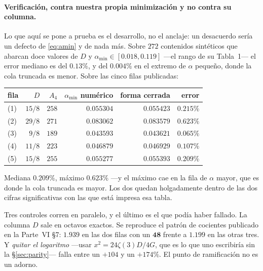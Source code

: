 \documentclass[11pt,a4paper]{article}
\newcommand{\rep}[1]{\mathbf{#1}}
\newcommand{\amin}{\alpha_{\min}}
\begin{document}
\paragraph{Verificación, contra nuestra propia minimización y no contra su columna.} Lo que aquí se
pone a prueba es el desarrollo, no el anclaje: un desacuerdo sería un defecto de \eqref{eq:amin} y
de nada más. Sobre $272$ contenidos sintéticos que abarcan doce valores de $D$ y
$\amin\in[0.018,0.119]$ ---el rango de su Tabla~1--- el error mediano es del $0.13\%$, y del
$0.004\%$ en el extremo de $\alpha$ pequeño, donde la cola truncada es menor. Sobre las
cinco filas publicadas:

\begin{center}\small
{}
\begin{tabular}{lrrrrr}
\toprule
\rowcolor{hdrblue!10}fila & $D$ & $A_4$ & $\amin$ numérico & forma cerrada & error\\
\midrule
(1) & $15/8$ & $258$ & $0.055304$ & $0.055423$ & $0.215\%$\\
\rowcolor{amber!12}(2) & $29/8$ & $271$ & $0.083062$ & $0.083579$ & $0.623\%$\\
(3) & $9/8$  & $189$ & $0.043593$ & $0.043621$ & $0.065\%$\\
(4) & $11/8$ & $223$ & $0.046879$ & $0.046929$ & $0.107\%$\\
(5) & $15/8$ & $255$ & $0.055277$ & $0.055393$ & $0.209\%$\\
\bottomrule
\end{tabular}
\end{center}

\noindent Mediana $0.209\%$, máximo $0.623\%$ ---y el máximo cae en la fila de $\alpha$ mayor, que es
donde la cola truncada es mayor. Los dos quedan holgadamente dentro de las
dos cifras significativas con las que está impresa esa tabla.

Tres controles corren en paralelo, y el último es el que podía haber fallado. La columna $D$ sale en
octavos exactos. Se reproduce el patrón de cocientes publicado en la Parte~VI \S7: $1.939$ en las
dos filas con un $\rep{48}$ frente a $1.199$ en las otras tres. Y \emph{quitar el logaritmo} ---usar
$x^2=24\zeta(3)D/4G$, que es lo que uno escribiría sin la \S\ref{sec:parity}--- falla entre un $+104$
y un $+174\%$. El punto de ramificación no es un adorno.
\end{document}
